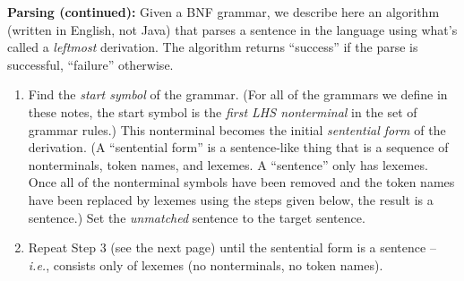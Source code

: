 \begin{minipage}[t]{\sw}
\slidenumber
\LARGE
{\bf Parsing (continued):}\exx
Given a BNF grammar,
we describe here an algorithm (written in English, not Java)
that parses a sentence in the language
using what's called a {\em leftmost} derivation.
The algorithm returns ``success'' if the parse is successful,
``failure'' otherwise.
\begin{enumerate}
\itemsep -0.5ex
\item
  Find the {\em start symbol} of the grammar.
  (For all of the grammars we define in these notes,
  the start symbol is
  the {\em first LHS nonterminal} in the set of grammar rules.)
  This nonterminal becomes the initial {\em sentential form}
  of the derivation.
  (A ``sentential form'' is a sentence-like thing
  that is a sequence of nonterminals, token names, and lexemes.
  A ``sentence'' only has lexemes.
  Once all of the nonterminal symbols have been removed
  and the token names have been replaced by lexemes
  using the steps given below,
  the result is a sentence.)
  Set the {\em unmatched} sentence to the target sentence.
\item
  Repeat Step 3 (see the next page)
  until the sentential form is a sentence -- {\em i.e.},
  consists only of lexemes (no nonterminals, no token names).
\end{enumerate}
\end{minipage}
\clearpage
